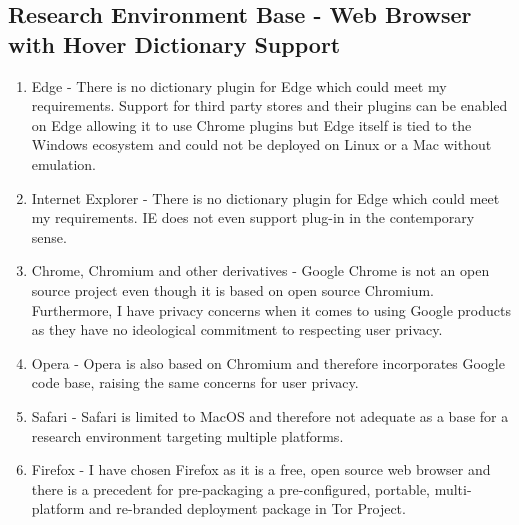 \documentclass{article}
\begin{document}
\subsection{Research Environment Base - Web Browser with Hover Dictionary Support}
\begin{enumerate}
    \item Edge - There is no dictionary plugin for Edge which could meet my requirements. Support for third party stores and their plugins can be enabled on Edge allowing it to use Chrome plugins but Edge itself is tied to the Windows ecosystem and could not be deployed on Linux or a Mac without emulation.
    \item Internet Explorer - There is no dictionary plugin for Edge which could meet my requirements. IE does not even support plug-in in the contemporary sense.
    \item Chrome, Chromium and other derivatives - Google Chrome is not an open source project even though it is based on open source Chromium. Furthermore, I have privacy concerns when it comes to using Google products as they have no ideological commitment to respecting user privacy.
    \item Opera - Opera is also based on Chromium and therefore incorporates Google code base, raising the same concerns for user privacy.
    \item Safari - Safari is limited to MacOS and therefore not adequate as a base for a research environment targeting multiple platforms.
    \item Firefox - I have chosen Firefox as it is a free, open source web browser and there is a precedent for pre-packaging a pre-configured, portable, multi-platform and re-branded deployment package in Tor Project.
\end{enumerate}
\end{document}
